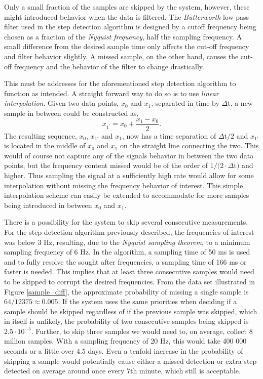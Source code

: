 \documentclass{LTHthesis}
\begin{document}
Only a small fraction of the samples are skipped by the system, however, these might introduced behavior when the data is filtered. The \emph{Butterworth} low pass filter used in the step detection algorithm is designed by a cutoff frequency being chosen as a fraction of the \emph{Nyquist frequency}, half the sampling frequency. A small difference from the desired sample time only affects the cut-off frequency and filter behavior slightly. A missed sample, on the other hand, causes the cut-off frequency and the behavior of the filter to change drastically. 

This must be addresses for the aforementioned step detection algorithm to function as intended. A straight forward way to do so is to use \emph{linear interpolation}.  Given two data points, $x_0$ and $x_1$, separated in time by $\Delta $t, a new sample in between could be constructed as,
%
\begin{equation}
x_{1^\prime}=x_0+\frac{x_1-x_0}{2}.
\end{equation}
%
The resulting sequence, $x_0$, $x_{1'}$ and $x_1$, now has a time separation of $\Delta $t$/2$ and $x_{1'}$ is located in the middle of $x_0$ and $x_1$ on the straight line connecting the two. This would of course not capture any of the signals behavior in between the two data points, but the frequency content missed would be of the order of $1/(2\cdot\Delta$t$)$ and higher. Thus sampling the signal at a sufficiently high rate would allow for some interpolation without missing the frequency behavior of interest. This simple interpolation scheme can easily be extended to accommodate for more samples being introduced in between $x_0$ and $x_1$.

There is a possibility for the system to skip several consecutive measurements. For the step detection algorithm previously described, the frequencies of interest was below 3 Hz, resulting, due to the \emph{Nyquist sampling theorem}, to a minimum sampling frequency of 6 Hz. In the algorithm, a sampling time of  50 ms is used and to fully resolve the sought after frequencies, a sampling time of 166 ms or faster is needed. This implies that at least three consecutive samples would need to be skipped to corrupt the desired frequencies. From the data set illustrated in Figure \ref{sample_diff}, the approximate probability of missing a single sample is $64/12375\approx0.005$. If the system uses the same priorities when deciding if a sample should be skipped regardless of if the previous sample was skipped, which in itself is unlikely, the probability of two consecutive samples being skipped is $2.5\cdot10^{-5}$. Further, to skip three samples we would need to, on average, collect 8 million samples. With a sampling frequency of 20 Hz, this would take 400 000 seconds or a little over 4.5 days. Even a tenfold increase in the probability of skipping a sample would potentially cause either a missed detection or extra step detected on average around once every 7th minute, which still is acceptable.              
%
\end{document}
